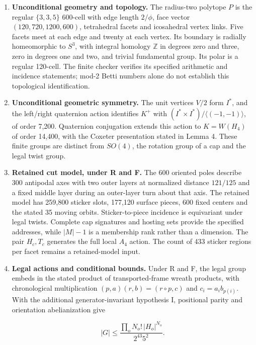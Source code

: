 \documentclass[
  10pt,
  a4paper,
]{article}
\begin{document}
\begin{enumerate}
\def\labelenumi{\arabic{enumi}.}
\item
  \textbf{Unconditional geometry and topology.} The radius-two polytope
  \(P\) is the regular \(\{3,3,5\}\) 600-cell with edge length
  \(2/\phi\), face vector \((120,720,1200,600)\), tetrahedral facets and
  icosahedral vertex links. Five facets meet at each edge and twenty at
  each vertex. Its boundary is radially homeomorphic to \(S^3\), with
  integral homology \(\mathbb Z\) in degrees zero and three, zero in
  degrees one and two, and trivial fundamental group. Its polar is a
  regular 120-cell. The finite checker verifies its specified arithmetic
  and incidence statements; mod-2 Betti numbers alone do not establish
  this topological identification.
\item
  \textbf{Unconditional geometric symmetry.} The unit vertices \(V/2\)
  form \(I^*\), and the left/right quaternion action identifies \(K^+\)
  with \((I^*\times I^*)/\langle(-1,-1)\rangle\), of order 7,200.
  Quaternion conjugation extends this action to \(K=W(H_4)\) of order
  14,400, with the Coxeter presentation stated in Lemma 4. These finite
  groups are distinct from \(SO(4)\), the rotation group of a cap and
  the legal twist group.
\item
  \textbf{Retained cut model, under R and F.} The 600 oriented poles
  describe 300 antipodal axes with two outer layers at normalized
  distance \(121/125\) and a fixed middle layer during an outer-layer
  turn about that axis. The retained model has 259,800 sticker slots,
  177,120 surface pieces, 600 fixed centers and the stated 35 moving
  orbits. Sticker-to-piece incidence is equivariant under legal twists.
  Complete cap signatures and hosting sets provide the specified
  addresses, while \(|M|-1\) is a membership rank rather than a
  dimension. The pair \(H_c,T_c\) generates the full local \(A_4\)
  action. The count of 433 sticker regions per facet remains a
  retained-model input.
\item
  \textbf{Legal actions and conditional bounds.} Under R and F, the
  legal group embeds in the stated product of transported-frame wreath
  products, with chronological multiplication
  \((p,a)(r,b)=(r\circ p,c)\) and \(c_i=a_i b_{p(i)}\). With the
  additional generator-invariant hypothesis I, positional parity and
  orientation abelianization give

  \begin{equation}
  |G|\leq \frac{\prod_o N_o!\,|H_o|^{N_o}}{2^{43}5^2}.
  \end{equation}


\end{enumerate}
\end{document}
